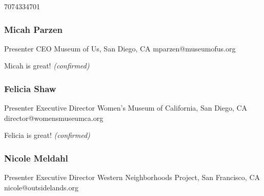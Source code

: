 \documentclass{report}
\begin{document}
              7074334701\newline

              


              

              
                \subsubsection*{ Micah Parzen }
                Presenter\newline
                CEO\newline
                Museum of Us, San Diego, CA
                \newline
                mparzen@museumofus.org\newline
                
                

                Micah is great!
                \emph{ (confirmed) }
              

              
                \subsubsection*{ Felicia  Shaw }
                Presenter\newline
                Executive Director\newline
                Women's Museum of California, San Diego, CA
                \newline
                director@womensmuseumca.org\newline
                
                

                Felicia is great!
                \emph{ (confirmed) }
              

              
                \subsubsection*{ Nicole  Meldahl }
                Presenter\newline
                Executive Director\newline
                Western Neighborhoods Project, San Francisco, CA
                \newline
                nicole@outsidelands.org\newline
                
\end{document}
